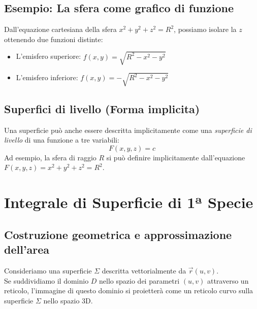 \subsection{Esempio: La sfera come grafico di funzione}
Dall'equazione cartesiana della sfera $x^2 + y^2 + z^2 = R^2$, possiamo isolare la $z$ ottenendo due funzioni distinte:
\begin{itemize}
    \item L'emisfero superiore: $f(x,y) = \sqrt{R^2 - x^2 - y^2}$
    \item L'emisfero inferiore: $f(x,y) = -\sqrt{R^2 - x^2 - y^2}$
\end{itemize}

\subsection{Superfici di livello (Forma implicita)}
Una superficie può anche essere descritta implicitamente come una \textit{superficie di livello} di una funzione a tre variabili:
$$ F(x,y,z) = c $$
Ad esempio, la sfera di raggio $R$ si può definire implicitamente dall'equazione $F(x,y,z) = x^2 + y^2 + z^2 = R^2$.


\newpage
\section{Integrale di Superficie di 1ª Specie}

\subsection{Costruzione geometrica e approssimazione dell'area}
Consideriamo una superficie $\Sigma$ descritta vettorialmente da $\vec{r}(u,v)$. \\
Se suddividiamo il dominio $D$ nello spazio dei parametri $(u,v)$ attraverso un reticolo, l'immagine di questo dominio si proietterà come un reticolo curvo sulla superficie $\Sigma$ nello spazio 3D. 


